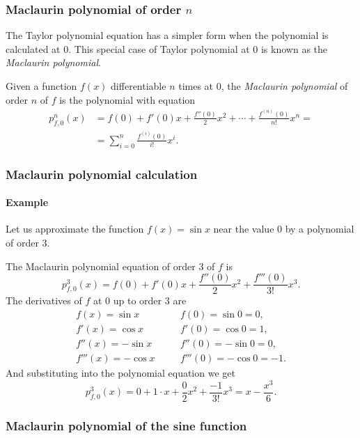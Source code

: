 \begin{frame}
	\frametitle{Maclaurin polynomial of order $n$}
	The Taylor polynomial equation has a simpler form when the polynomial is calculated at $0$.
	This special case of Taylor polynomial at $0$ is known as the \emph{Maclaurin polynomial}.
	\begin{definition}
		Given a function $f(x)$ differentiable $n$ times at $0$, the \emph{Maclaurin polynomial} of order $n$ of $f$ is the polynomial with equation
		\begin{align*}
			p_{f,0}^n(x) & =f(0)+f'(0)x+\frac{f''(0)}{2}x^2+\cdots +\frac{f^{(n)}(0)}{n!}x^n = \\ &=\sum_{i=0}^{n}\frac{f^{(i)}(0)}{i!}x^i.
		\end{align*}
	\end{definition}
\end{frame}


\begin{frame}
	\frametitle{Maclaurin polynomial calculation}
	\framesubtitle{Example}
	Let us approximate the function $f(x)=\sin x$ near the value $0$ by a polynomial of order $3$.
	
	The Maclaurin polynomial equation of order $3$ of $f$ is
	\[
		p_{f,0}^3(x)=f(0)+f'(0)x+\frac{f''(0)}{2}x^2+\frac{f'''(0)}{3!}x^3.
	\]
	The derivatives of $f$ at $0$ up to order $3$ are
	\[
		\begin{array}{lll}
			f(x)=\sin x     & \quad & f(0)=\sin 0 =0,     \\
			f'(x)=\cos x    &       & f'(0)=\cos 0=1,     \\
			f''(x)=-\sin x  &       & f''(0)=-\sin 0=0,   \\
			f'''(x)=-\cos x &       & f'''(0)=-\cos 0=-1. 
		\end{array}
	\]
	And substituting into the polynomial equation we get
	\[
		p_{f,0}^3(x)=0+1\cdot x+\frac{0}{2}x^2+\frac{-1}{3!}x^3= x-\frac{x^3}{6}.
	\]
\end{frame}


\begin{frame}
	\frametitle{Maclaurin polynomial of the sine function}
	\begin{center}
		
	\end{center}
\end{frame}


